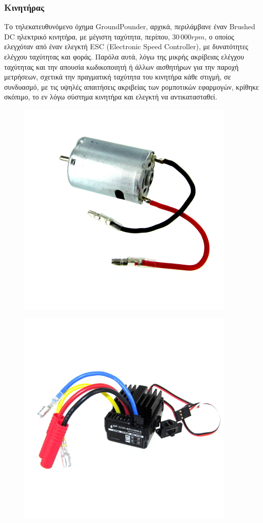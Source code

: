 \subsubsection{Κινητήρας} \label{sssec:motor}
Το τηλεκατευθυνόμενο όχημα GroundPounder, αρχικά, περιλάμβανε έναν {Brushed DC ηλεκτρικό κινητήρα}, με μέγιστη ταχύτητα, περίπου, $30\,000rpm$, ο οποίος ελεγχόταν από έναν ελεγκτή {ESC} (Electronic Speed Controller), με δυνατότητες ελέγχου ταχύτητας και φοράς. Παρόλα αυτά, λόγω της μικρής ακρίβειας ελέγχου ταχύτητας και την απουσία {κωδικοποιητή} ή άλλων αισθητήρων για την παροχή μετρήσεων, σχετικά την πραγματική ταχύτητα του κινητήρα κάθε στιγμή, σε συνδυασμό, με τις υψηλές απαιτήσεις ακριβείας των ρομποτικών εφαρμογών, κρίθηκε σκόπιμο, το εν λόγω σύστημα κινητήρα και ελεγκτή να αντικατασταθεί.

\begin{figure}[!ht]
	\begin{minipage}{.49\textwidth}
 	\centering
		\includegraphics[width=0.6\linewidth]{Chapters/Chapter2/Figures/original_motor.jpg}
		\label{fig:original_motor}
	\end{minipage}
	\begin{minipage}{.5\textwidth}		
		\centering
		\includegraphics[width=0.6\linewidth]{Chapters/Chapter2/Figures/esc.jpg}
		\label{fig:esc}
	\end{minipage}
\end{figure}

